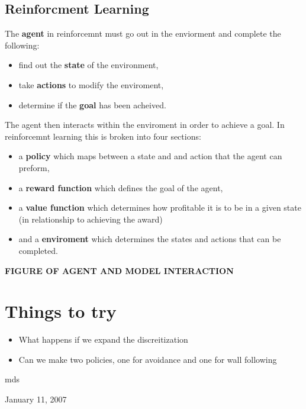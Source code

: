 \documentclass[conference]{IEEEtran}
\begin{document}
\subsection{Reinforcment Learning}
The \textbf{agent} in reinforcemnt must go out in the enviorment and complete the following:
\begin{itemize}
	\item find out the \textbf{state} of the environment,
	\item take \textbf{actions} to modify the enviroment,
	\item determine if the \textbf{goal} has been acheived.
\end{itemize}
The agent then interacts within the enviroment in order to achieve a goal.  In reinforcemnt learning this is broken into four sections:
\begin{itemize}
	\item a \textbf{policy} which maps between a state and and action that the agent can preform,
	\item a \textbf{reward function} which defines the goal of the agent,
	\item a \textbf{value function} which determines how profitable it is to be in a given state (in relationship to achieving the award)
	\item and a \textbf{enviroment} which determines the states and actions that can be completed.
\end{itemize}

\textbf{FIGURE OF AGENT AND MODEL INTERACTION}




\section{Things to try}
\begin{itemize}
	\item What happens if we expand the discreitization
	\item Can we make two policies, one for avoidance and one for wall following
\end{itemize}

\hfill mds
 
\hfill January 11, 2007
\end{document}
